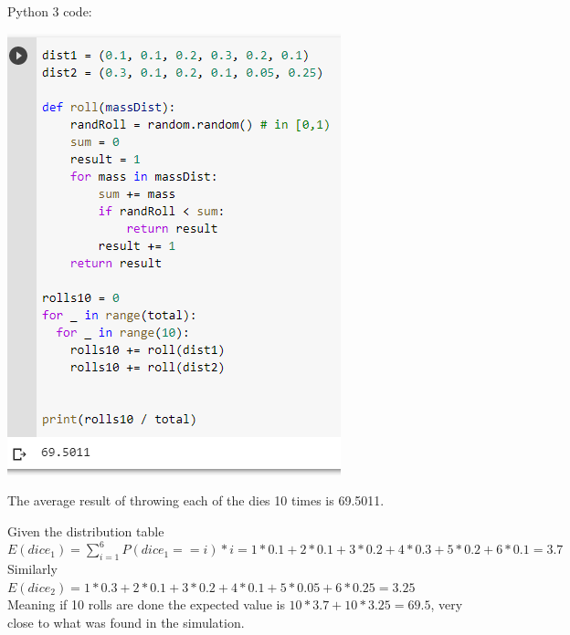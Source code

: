 \documentclass{article}
\begin{document}
\begin{enumerate}[1.]
Python 3 code: \\
\begin{center}
\includegraphics{a3_q4}
\end{center}

The average result of throwing each of the dies 10 times is 69.5011. 

Given the distribution table $E(dice_1) = \sum_{i = 1}^{6}{P(dice_1 == i) * i} = 1 * 0.1 + 2 * 0.1 + 3 * 0.2 + 4 * 0.3 + 5 * 0.2 + 6 * 0.1 = 3.7$ \\
Similarly $E(dice_2) = 1 * 0.3 + 2 * 0.1 + 3 * 0.2 + 4 * 0.1 + 5 * 0.05 + 6 * 0.25 = 3.25$ \\
Meaning if 10 rolls are done the expected value is $10 * 3.7 + 10 * 3.25 = 69.5$, very close to what was found in the simulation. 

\end{enumerate}
\end{document}
